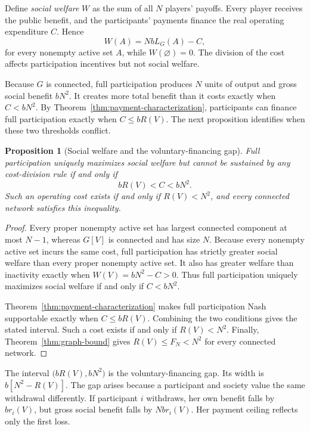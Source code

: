 \documentclass[preprint,12pt,authoryear]{elsarticle}
\newcommand{\LCC}{L}
\newtheorem{proposition}{Proposition}
\begin{document}
Define \emph{social welfare} \(W\) as the sum of all \(N\) players' payoffs.
Every player receives the public benefit, and the participants' payments
finance the real operating expenditure \(C\). Hence
\[
 W(A)=Nb\LCC_G(A)-C,
\]
for every nonempty active set \(A\), while \(W(\varnothing)=0\). The division
of the cost affects participation incentives but not social welfare.

Because \(G\) is connected, full participation produces \(N\) units of output
and gross social benefit \(bN^2\). It creates more total benefit than it costs
exactly when \(C<bN^2\). By
Theorem~\ref{thm:payment-characterization}, participants can finance full
participation exactly when \(C\leq bR(V)\). The next proposition identifies
when these two thresholds conflict.

\begin{proposition}[Social welfare and the voluntary-financing gap]
\label{prop:welfare-gap}
Full participation uniquely maximizes social welfare but cannot be sustained
by any cost-division rule if and only if
\[
 bR(V)<C<bN^2.
\]
Such an operating cost exists if and only if \(R(V)<N^2\), and every connected
network satisfies this inequality.
\end{proposition}

\begin{proof}
Every proper nonempty active set has largest connected component at most
\(N-1\), whereas \(G[V]\) is connected and has size \(N\). Because every
nonempty active set incurs the same cost, full participation has strictly
greater social welfare than every proper nonempty active set. It also has
greater welfare than inactivity exactly when \(W(V)=bN^2-C>0\). Thus full
participation uniquely maximizes social welfare if and only if \(C<bN^2\).

Theorem~\ref{thm:payment-characterization} makes full participation Nash
supportable exactly when \(C\leq bR(V)\). Combining the two conditions gives
the stated interval. Such a cost exists if and only if \(R(V)<N^2\). Finally,
Theorem~\ref{thm:graph-bound} gives \(R(V)\leq F_N<N^2\) for every connected
network.
\end{proof}

The interval \(\bigl(bR(V),bN^2\bigr)\) is the voluntary-financing gap. Its
width is \(b[N^2-R(V)]\). The gap arises because a participant and society value
the same withdrawal differently. If participant \(i\) withdraws, her own
benefit falls by \(br_i(V)\), but gross social benefit falls by \(Nbr_i(V)\).
Her payment ceiling reflects only the first loss.
\end{document}
